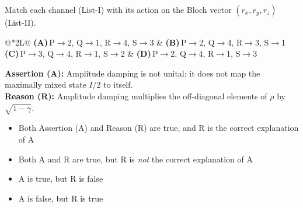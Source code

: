 \documentclass[11pt,a4paper]{article}
\newcommand{\optlabel}[1]{\textbf{(#1)}}
\newenvironment{qitem}[1]{\begin{list}{}{\setlength{\leftmargin}{3.3em}\setlength{\labelwidth}{3.1em}%
  \setlength{\labelsep}{0.2em}\setlength{\topsep}{3pt}\setlength{\parsep}{3pt}}\item[\textbf{Q.#1}\hfill]}{\end{list}}
\newcommand{\qsep}{\par\vspace{2pt}{\color{black!15}\hrule}\vspace{4pt}}
\begin{document}
\begin{qitem}{36}
Match each channel (List-I) with its action on the Bloch vector $(r_x, r_y, r_z)$ (List-II).
\par\smallskip{}
\par\smallskip\noindent\begin{tabularx}{\linewidth}{@{}*{2}{L}@{}}
\optlabel{A}\,P$\to$2, Q$\to$1, R$\to$4, S$\to$3 & \optlabel{B}\,P$\to$2, Q$\to$4, R$\to$3, S$\to$1 \\[3pt]
\optlabel{C}\,P$\to$3, Q$\to$4, R$\to$1, S$\to$2 & \optlabel{D}\,P$\to$2, Q$\to$4, R$\to$1, S$\to$3
\end{tabularx}
\end{qitem}
\qsep

\begin{qitem}{37}
\textbf{Assertion (A):} Amplitude damping is not unital: it does not map the maximally mixed state $I/2$ to itself.\\[1mm]
\textbf{Reason (R):} Amplitude damping multiplies the off-diagonal elements of $\rho$ by $\sqrt{1 - \gamma}$.
\begin{itemize}[leftmargin=2.6em, labelsep=0.4em, itemsep=2pt, topsep=3pt]
\item[\optlabel{A}] Both Assertion (A) and Reason (R) are true, and R is the correct explanation of A
\item[\optlabel{B}] Both A and R are true, but R is \emph{not} the correct explanation of A
\item[\optlabel{C}] A is true, but R is false
\item[\optlabel{D}] A is false, but R is true
\end{itemize}
\end{qitem}
\qsep
\end{document}
